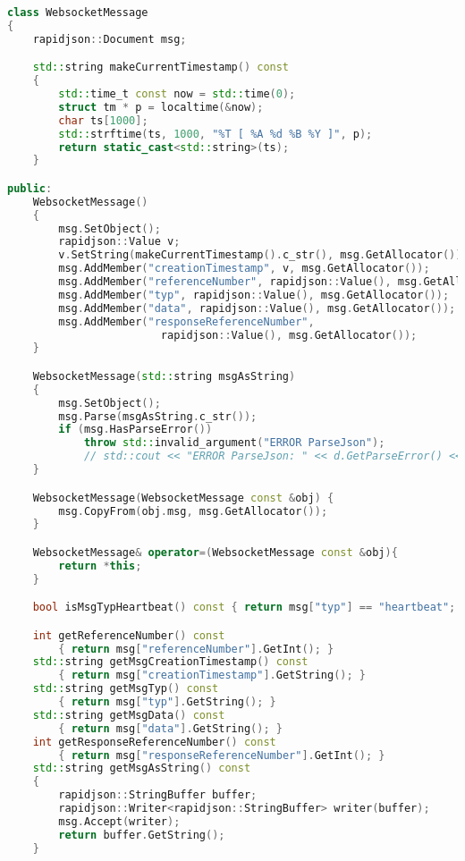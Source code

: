 \documentclass[thesis.tex]{subfiles}
\begin{document}
\begin{lstlisting}[caption={Nachrichtenklasse im Prototypen},captionpos=b,language=C++,label=messageklasse]
class WebsocketMessage
{
    rapidjson::Document msg;

    std::string makeCurrentTimestamp() const
    {
        std::time_t const now = std::time(0);
        struct tm * p = localtime(&now);
        char ts[1000];
        std::strftime(ts, 1000, "%T [ %A %d %B %Y ]", p);
        return static_cast<std::string>(ts);
    }

public:
    WebsocketMessage()
    {
        msg.SetObject();
        rapidjson::Value v;
        v.SetString(makeCurrentTimestamp().c_str(), msg.GetAllocator());
        msg.AddMember("creationTimestamp", v, msg.GetAllocator());
        msg.AddMember("referenceNumber", rapidjson::Value(), msg.GetAllocator());
        msg.AddMember("typ", rapidjson::Value(), msg.GetAllocator());
        msg.AddMember("data", rapidjson::Value(), msg.GetAllocator());
        msg.AddMember("responseReferenceNumber",
                        rapidjson::Value(), msg.GetAllocator());
    }

    WebsocketMessage(std::string msgAsString)
    {
        msg.SetObject();
        msg.Parse(msgAsString.c_str());
        if (msg.HasParseError())
            throw std::invalid_argument("ERROR ParseJson");
            // std::cout << "ERROR ParseJson: " << d.GetParseError() << std::endl;
    }

    WebsocketMessage(WebsocketMessage const &obj) {
        msg.CopyFrom(obj.msg, msg.GetAllocator());
    }

    WebsocketMessage& operator=(WebsocketMessage const &obj){
        return *this;
    }

    bool isMsgTypHeartbeat() const { return msg["typ"] == "heartbeat"; }

    int getReferenceNumber() const
        { return msg["referenceNumber"].GetInt(); }
    std::string getMsgCreationTimestamp() const
        { return msg["creationTimestamp"].GetString(); }
    std::string getMsgTyp() const
        { return msg["typ"].GetString(); }
    std::string getMsgData() const
        { return msg["data"].GetString(); }
    int getResponseReferenceNumber() const
        { return msg["responseReferenceNumber"].GetInt(); }
    std::string getMsgAsString() const
    {
        rapidjson::StringBuffer buffer;
        rapidjson::Writer<rapidjson::StringBuffer> writer(buffer);
        msg.Accept(writer);
        return buffer.GetString();
    }


\end{lstlisting}
\end{document}
